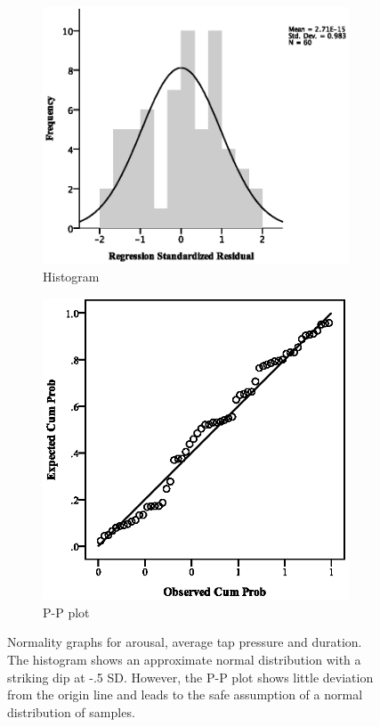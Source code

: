 \par\bigskip
\par\bigskip
\begin{figure}[ht]
\centering
\begin{subfigure}[b]{0.45\textwidth}
    \centering
    \includegraphics[width=\textwidth]{images/normality/ArMax/HistArMax.eps}
    \caption{Histogram}
    \label{fig:histarmax}
\end{subfigure}
\quad
\begin{subfigure}[b]{0.45\textwidth}
    \centering
    \includegraphics[width=\textwidth]{images/normality/ArMax/PPArMax.eps}
    \caption{P-P plot}
    \label{fig:pparmax}
\end{subfigure}
\caption{Normality graphs for arousal, average tap pressure and duration. The histogram shows an approximate normal distribution with a striking dip at -.5 SD. However, the P-P plot shows little deviation from the origin line and leads to the safe assumption of a normal distribution of samples.}
\end{figure}
